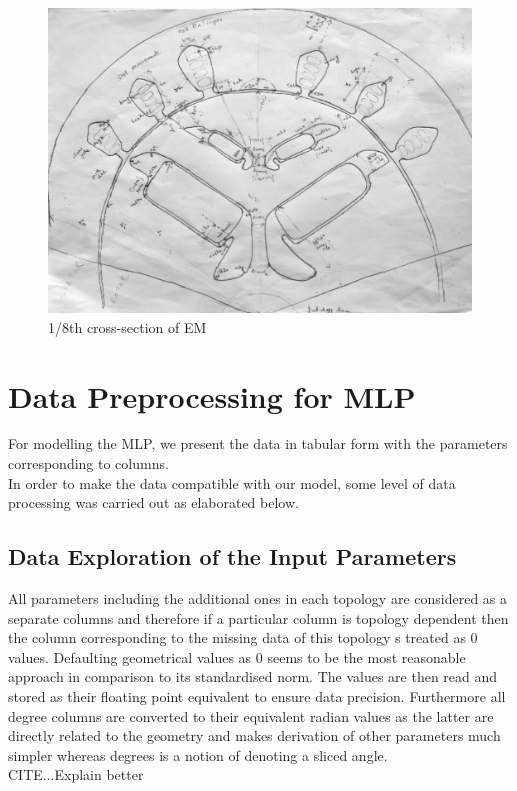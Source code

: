 \documentclass{report} %
\begin{document}
\begin{figure}[H]
    \centering
    \includegraphics[width=1\textwidth]{./ReportImages/EMCrosssectionFiltered.png} 
    \caption{1/8th cross-section of \ac{EM}}
    \label{fig:1/8 Motor Crossection}
\end{figure}

\section{Data Preprocessing for \ac{MLP}}\label{sec:Data Preprocessing for MLP}
For modelling the \ac{MLP}, we present the data in tabular form with the parameters corresponding to columns. \\
In order to make the data compatible with our model, some level of data processing was carried out as elaborated below.

\subsection{Data Exploration of the Input Parameters}\label{subsec:Deep Dive into Input Parameters}
All parameters including the additional ones in each topology are considered as a separate columns and therefore if a particular column is topology dependent then the 
column corresponding to the missing data of this topology s treated as 0 values. Defaulting geometrical values as 0 seems to be the most reasonable approach in comparison 
to its standardised norm.
The values are then read and stored as their floating point equivalent to ensure data precision.
Furthermore all degree columns are converted to their equivalent radian values as the latter are directly related to the geometry and makes derivation of other 
parameters much simpler whereas degrees is a notion of denoting a sliced angle.\\ CITE...Explain better
\end{document}
